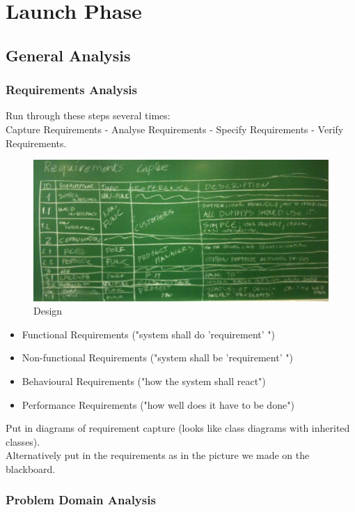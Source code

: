 \newpage
\section{Launch Phase}
\subsection{General Analysis}
	\subsubsection{Requirements	 Analysis}
	Run through these steps several times:\\
	Capture Requirements - Analyse Requirements - Specify Requirements - Verify Requirements.
		\begin{figure}[h!]		%
			\begin{centering}
				 \includegraphics[width=1.0\textwidth]{images/requirement_capture.JPG}
		 		\caption{Design}
			 \end{centering}
		\end{figure}
		\begin{itemize}
			\item Functional Requirements ("system shall do 'requirement' ")
			\item Non-functional Requirements ("system shall be 'requirement' ")
			\item Behavioural Requirements ("how the system shall react")
			\item Performance Requirements ("how well does it have to be done")
		\end{itemize}
		Put in diagrams of requirement capture (looks like class diagrams with inherited classes).\\
		Alternatively put in the requirements as in the picture we made on the blackboard.
	\subsubsection{Problem Domain Analysis}
